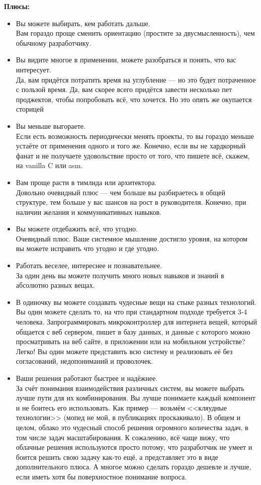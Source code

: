 \documentclass[14pt,a4paper,oneside]{extbook}
\begin{document}
		\noindent\textbf{Плюсы:}
		\begin{itemize}
			\item Вы можете выбирать, кем работать дальше.\\ Вам гораздо проще сменить ориентацию (простите за двусмысленность), чем обычному разработчику.
			\item Вы видите многое в применении, можете разобраться и понять, что вас интересует.\\ Да, вам придётся потратить время на углубление --- но это будет потраченное с пользой время. Да, вам скорее всего придётся завести несколько пет проджектов, чтобы попробовать всё, что хочется. Но это опять же окупается сторицей
			\item Вы меньше выгораете.\\ Если есть возможность периодически менять проекты, то вы гораздо меньше устаёте от применения одного и того же. Конечно, если вы не хардкорный фанат и не получаете удовольствие просто от того, что пишете всё, скажем, на vanilla C или asm.
			\item Вам проще расти в тимлида или архитектора.\\ Довольно очевидный плюс --- чем больше вы разбираетесь в общей структуре, тем больше у вас шансов на рост в руководителя. Конечно, при наличии желания и коммуникативных навыков.
			\item Вы можете отдебажить всё, что угодно.\\ Очевидный плюс. Ваше системное мышление достигло уровня, на котором вы можете исправить что угодно и где угодно.
			\item Работать веселее, интереснее и познавательнее.\\ За один день вы можете получить много новых навыков и знаний в абсолютно разных вещах.
			\item В одиночку вы можете создавать чудесные вещи на стыке разных технологий.\\ Вы один можете сделать то, на что при стандартном подходе требуется 3-4 человека. Запрограммировать микроконтроллер для интернета вещей, который общается с веб сервером, пишет в базу данных, и данные с которого можно просматривать на веб сайте, в приложении или на мобильном устройстве? Легко! Вы один можете представить всю систему и реализовать её без согласований, недопониманий и проволочек.
			\item Ваши решения работают быстрее и надёжнее.\\ За счёт понимания взаимодействия различных систем, вы можете выбрать лучше пути для их комбинирования. Вы лучше понимаете каждый компонент и не боитесь его использовать. Как пример --- возьмём <<кляудные технологии>> (мопед не мой, в публикациях проскакивало). В общем и целом, облако это чудесный способ решения огромного количества задач, в том числе задач масштабирования. К сожалению, всё чаще вижу, что облачные решения используются просто потому, что разработчик не умеет и боится решить свою задачу как-то ещё, а представляет это в виде дополнительного плюса. А многое можно сделать гораздо дешевле и лучше, если иметь хотя бы поверхностное понимание вопроса.

\end{itemize}
\end{document}
